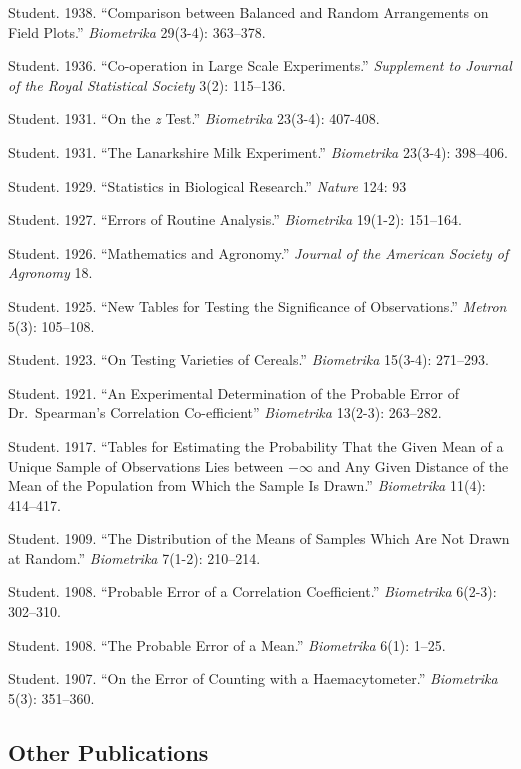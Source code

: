 \documentclass[11pt,]{article}
\begin{document}
Student. 1938. ``Comparison between Balanced and Random Arrangements on
Field Plots.'' \emph{Biometrika} 29(3-4): 363--378.

Student. 1936. ``Co-operation in Large Scale Experiments.''
\emph{Supplement to Journal of the Royal Statistical Society} 3(2):
115--136.

Student. 1931. ``On the \emph{z} Test.'' \emph{Biometrika} 23(3-4):
407-408.

Student. 1931. ``The Lanarkshire Milk Experiment.'' \emph{Biometrika}
23(3-4): 398--406.

Student. 1929. ``Statistics in Biological Research.'' \emph{Nature} 124:
93

Student. 1927. ``Errors of Routine Analysis.'' \emph{Biometrika}
19(1-2): 151--164.

Student. 1926. ``Mathematics and Agronomy.'' \emph{Journal of the
American Society of Agronomy} 18.

Student. 1925. ``New Tables for Testing the Significance of
Observations.'' \emph{Metron} 5(3): 105--108.

Student. 1923. ``On Testing Varieties of Cereals.'' \emph{Biometrika}
15(3-4): 271--293.

Student. 1921. ``An Experimental Determination of the Probable Error of
Dr.~Spearman's Correlation Co-efficient'' \emph{Biometrika} 13(2-3):
263--282.

Student. 1917. ``Tables for Estimating the Probability That the Given
Mean of a Unique Sample of Observations Lies between \(-\infty\) and Any
Given Distance of the Mean of the Population from Which the Sample Is
Drawn.'' \emph{Biometrika} 11(4): 414--417.

Student. 1909. ``The Distribution of the Means of Samples Which Are Not
Drawn at Random.'' \emph{Biometrika} 7(1-2): 210--214.

Student. 1908. ``Probable Error of a Correlation Coefficient.''
\emph{Biometrika} 6(2-3): 302--310.

Student. 1908. ``The Probable Error of a Mean.'' \emph{Biometrika} 6(1):
1--25.

Student. 1907. ``On the Error of Counting with a Haemacytometer.''
\emph{Biometrika} 5(3): 351--360.

\hypertarget{other-publications}{%
\subsection{Other Publications}\label{other-publications}}
\end{document}
